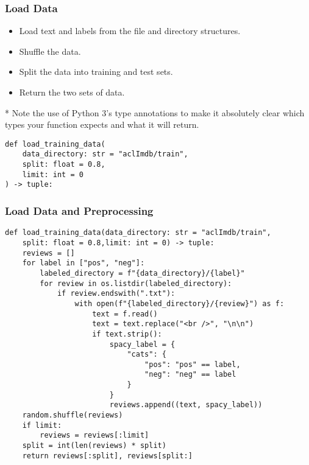 \begin{frame}[fragile]\frametitle{Load Data}

\begin{itemize}
\item Load text and labels from the file and directory structures.
\item Shuffle the data.
\item Split the data into training and test sets.
\item Return the two sets of data.
\end{itemize}

* Note the use of Python 3’s type annotations to make it absolutely clear which types your function expects and what it will return.


\begin{lstlisting}
def load_training_data(
    data_directory: str = "aclImdb/train",
    split: float = 0.8,
    limit: int = 0
) -> tuple:
\end{lstlisting}


\end{frame}

\begin{frame}[fragile]\frametitle{Load Data and Preprocessing}

\begin{lstlisting}
def load_training_data(data_directory: str = "aclImdb/train",
    split: float = 0.8,limit: int = 0) -> tuple:
    reviews = []
    for label in ["pos", "neg"]:
        labeled_directory = f"{data_directory}/{label}"
        for review in os.listdir(labeled_directory):
            if review.endswith(".txt"):
                with open(f"{labeled_directory}/{review}") as f:
                    text = f.read()
                    text = text.replace("<br />", "\n\n")
                    if text.strip():
                        spacy_label = {
                            "cats": {
                                "pos": "pos" == label,
                                "neg": "neg" == label
                            }
                        }
                        reviews.append((text, spacy_label))
    random.shuffle(reviews)
    if limit:
        reviews = reviews[:limit]
    split = int(len(reviews) * split)
    return reviews[:split], reviews[split:]												
\end{lstlisting}

\end{frame}

